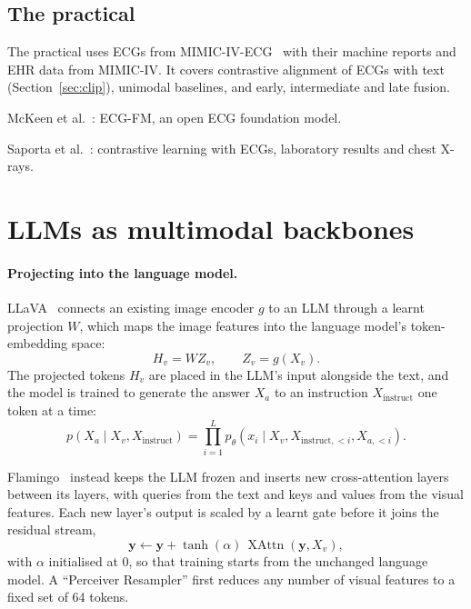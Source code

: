\subsection{The practical}
\label{sec:lab}

The practical uses ECGs from MIMIC-IV-ECG~\cite{gow2023mimicivecg} with their
machine reports and EHR data from MIMIC-IV. It covers contrastive alignment of
ECGs with text (Section~\ref{sec:clip}), unimodal baselines, and early,
intermediate and late fusion.


\begin{furtherreading}
  \item McKeen et al.~\cite{mckeen2025ecgfm}: ECG-FM, an open ECG foundation model.
  \item Saporta et al.~\cite{saporta2024symile}: contrastive learning with ECGs,
        laboratory results and chest X-rays.
\end{furtherreading}


\section{LLMs as multimodal backbones}
\label{sec:llms}

\paragraph{Projecting into the language model.} LLaVA~\cite{liu2023visual}
connects an existing image encoder $g$ to an LLM through a learnt projection $W$,
which maps the image features into the language model's token-embedding space:
\begin{equation}
  H_v = W Z_v, \qquad Z_v = g(X_v).
\end{equation}
The projected tokens $H_v$ are placed in the LLM's input alongside the text, and
the model is trained to generate the answer $X_a$ to an instruction
$X_{\text{instruct}}$ one token at a time:
\begin{equation}
  p(X_a \mid X_v, X_{\text{instruct}}) = \prod_{i=1}^{L} p_\theta\left(x_i \mid X_v, X_{\text{instruct},<i}, X_{a,<i}\right).
\end{equation}

Flamingo~\cite{alayrac2022flamingo} instead keeps the LLM frozen and inserts new
cross-attention layers between its layers, with queries from the text and keys and
values from the visual features. Each new layer's output is scaled by a learnt
gate before it joins the residual stream,
\begin{equation}
  \mathbf{y} \leftarrow \mathbf{y} + \tanh(\alpha)\, \operatorname{XAttn}(\mathbf{y}, X_v),
\end{equation}
with $\alpha$ initialised at 0, so that training starts from the unchanged
language model. A ``Perceiver Resampler'' first reduces any number of visual
features to a fixed set of 64 tokens.

